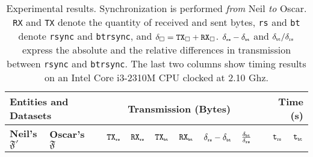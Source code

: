 \documentclass[twoside,envcountsame,runningheads]{llncs}
\newcommand{\btrsync}{\texttt{btrsync}\xspace}
\newcommand{\rsync}{\texttt{rsync}\xspace}
\def\fullversion{0} %
\newcommand{\full}[2]{%
\ifnum\fullversion=1%
#1%
\else%
#2%
\fi}
\begin{document}

\begin{table}[t]
  \centering
  \caption{Experimental results. Synchronization is performed \textit{from} Neil \textit{to} Oscar. {\tt RX} and {\tt TX} denote the quantity of received and sent bytes, {\tt rs} and {\tt bt} denote {\tt rsync} and {\tt btrsync}, and $\delta_{\square}=\mbox{{\tt TX}}_{\square}+\mbox{{\tt RX}}_{\square}$. $\delta_{\mbox{{\tiny {\tt rs}}}}-\delta_{\mbox{{\tiny {\tt bt}}}}$ and ${\delta_{\mbox{{\tiny {\tt bt}}}}}/{\delta_{\mbox{{\tiny {\tt rs}}}}}$ express the absolute and the relative differences in transmission between \rsync and \btrsync. The last two columns show timing results on an Intel Core i3-2310M CPU clocked at 2.10 Ghz.}
  \label{tab:results}
  \setlength{\tabcolsep}{3pt}
  \begin{tabularx}{\textwidth}{ll X r r r r r r X r r }
    \toprule
    \multicolumn{2}{l}{\bf Entities and Datasets %
}&  &  \multicolumn{6}{c}{\bf Transmission (Bytes)} &  & \multicolumn{2}{r}{\bf Time (s)} \\
    \midrule {\bf Neil's $\mathfrak{F}'$}  & {\bf Oscar's $\mathfrak{F}$}
    & & $\mbox{{\tt TX}}_{\mbox{{\tiny {\tt rs}}}}$ & $\mbox{{\tt RX}}_{\mbox{{\tiny {\tt rs}}}}$  & $\mbox{{\tt TX}}_{\mbox{{\tiny {\tt bt}}}}$  & $\mbox{{\tt RX}}_{\mbox{{\tiny {\tt bt}}}}$  & $\delta_{\mbox{{\tiny {\tt rs}}}}-\delta_{\mbox{{\tiny {\tt bt}}}}$ &
    $\frac{\delta_{\mbox{{\tiny {\tt bt}}}}}{\delta_{\mbox{{\tiny {\tt rs}}}}}$ & & $\mbox{{\tt t}}_{\mbox{{\tiny {\tt rs}}}}$ & $\mbox{{\tt t}}_{\mbox{{\tiny {\tt bt}}}}$ \\\midrule
    
    \bottomrule
  \end{tabularx}\smallskip
\end{table}
\end{document}
